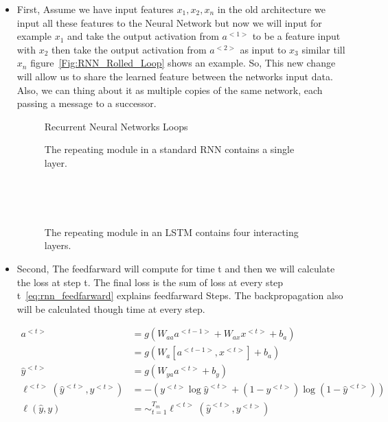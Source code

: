 \begin{itemize}
\item First, Assume we have input features $x_1, x_2, x_n$ in the old architecture we input all these features to the Neural Network but now we will input for example $x_1$ and take the output activation from $a^{<1>}$ to be a feature input with $x_2$ then take the output activation from $a^{<2>}$ as input to $x_3$ similar till $x_n$ figure~\ref{Fig:RNN_Rolled_Loop} shows an example. So, This new change will allow us to share the learned feature between the networks input data. Also, we can thing about it as multiple copies of the same network, each passing a message to a successor\cite{colah}.%
\begin{figure}[t]
\minipage{\textwidth}
\centering

\endminipage\hfill
\caption{Recurrent Neural Networks Loops\cite{colah}}\label{Fig:RNN_Rolled_Loop}


\endminipage\hfill
{}

\endminipage\hfill
{}%

\endminipage
\caption{The repeating module in a standard RNN contains a single layer.\cite{colah}}~\label{Fig:LSTM_SimpleRNN}


\endminipage\hfill
{}

\endminipage\hfill
{}%

\endminipage
\caption{The repeating module in an LSTM contains four interacting layers.\cite{colah}}~\label{Fig:LSTM_Cell_Chaining}
\end{figure}


\item Second, The feedfarward will compute for time t and then we will calculate the loss at step t. The final loss is the sum of loss at every step t~\eqref{eq:rnn_feedfarward} explains feedfarward Steps. The backpropagation also will be calculated though time at every step.%
  
  \begin{subequations}\label{eq:rnn_feedfarward}
\begin{align}
  a^{<t>} & = g(W_{aa}a^{<t-1>}+ W_{ax}x^{<t>}+b_a)\\
   & = g(W_a[a^{<t-1>},x^{<t>}]+ b_a)\\
  \widehat{y}^{<t>} & = g(W_{ya}a^{<t>}+ b_y)
  \\ \ell^{<t>}(\widehat{y}^{<t>},y^{<t>}) & = - (y^{<t>} \log \widehat{y}^{<t>} + (1-y^{<t>}) \log (1-\widehat{y}^{<t>}))
\\ \ell(\widehat{y},y) & = \sim_{t=1}^{T_m} \ell^{<t>}(\widehat{y}^{<t>},y^{<t>})                                              
\end{align}
\end{subequations}%
 \end{itemize}



